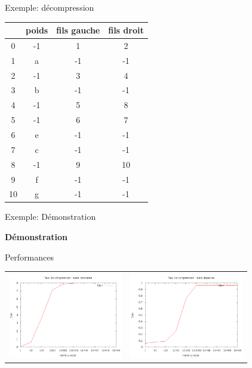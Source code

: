 \documentclass[french]{beamer}
\begin{document}
\begin{frame}{Exemple: décompression}
		
	\begin{tabular}{|c|c|c|c|}
	\hline
	 & poids & fils gauche & fils droit \\
	\hline 0 & -1 & 1 & 2 \\
	\hline 1 & a & -1 & -1\\
	\hline  2 & -1 & 3 & 4 \\
	\hline 3& b & -1 & -1 \\
	\hline 4&-1 & 5 & 8 \\
	\hline 5&-1 & 6 & 7 \\
	\hline 6&e & -1 & -1 \\
	\hline 7&c & -1 & -1 \\
	\hline 8& -1 & 9 & 10 \\
	\hline 9&f & -1 & -1\\
	\hline 10&g & -1 & -1\\
	\hline
	\end{tabular}
\end{frame}
\begin{frame}{Exemple: Démonstration}
	\begin{center}
	\textbf{Démonstration}
	\end{center}
\end{frame}

\begin{frame}{Performances}
	\begin{center}
	\begin{tabular}{l | l}
	\includegraphics[width=5cm]{HConstant.png} & 
	\includegraphics[width=5cm]{aleaH.png}
	\end{tabular}
	\end{center}
\end{frame}
\end{document}
